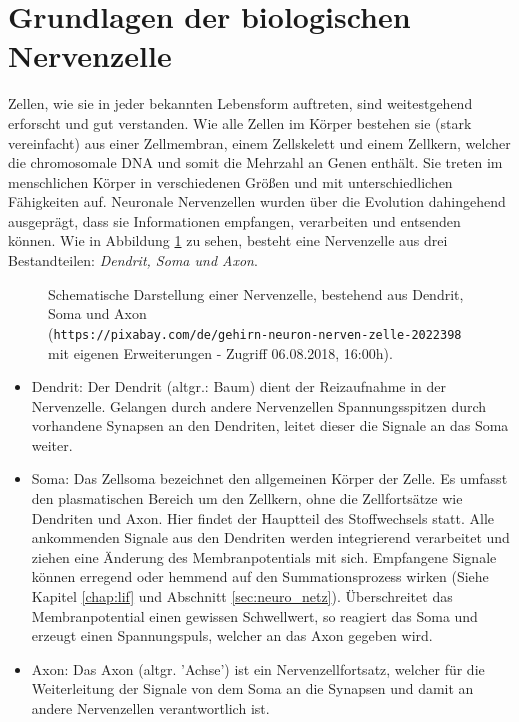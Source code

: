 \section{Grundlagen der biologischen Nervenzelle}
\label{sec:neuro_nervenzelle}
	Zellen, wie sie in jeder bekannten Lebensform auftreten, sind weitestgehend erforscht und gut verstanden. Wie alle Zellen im Körper bestehen sie (stark vereinfacht) aus einer Zellmembran, einem Zellskelett und einem Zellkern, welcher die chromosomale DNA und somit die Mehrzahl an Genen enthält. Sie treten im menschlichen Körper in verschiedenen Größen und mit unterschiedlichen Fähigkeiten auf. Neuronale Nervenzellen wurden über die Evolution dahingehend ausgeprägt, dass sie Informationen empfangen, verarbeiten und entsenden können. Wie in Abbildung \ref{fig:neuron} zu sehen, besteht eine Nervenzelle aus drei Bestandteilen: \textit{Dendrit, Soma und Axon}.
	\begin{figure}[H] %
		\centering
		\def\svgwidth{12cm}
		
		\caption{Schematische Darstellung einer Nervenzelle, bestehend aus Dendrit, Soma und Axon\\(\texttt{https://pixabay.com/de/gehirn-neuron-nerven-zelle-2022398} mit eigenen Erweiterungen - Zugriff 06.08.2018, 16:00h).}
		\label{fig:neuron}
	\end{figure}
	\begin{itemize}
		\item Dendrit:
			\subitem Der Dendrit (altgr.: \glqq Baum\grqq) dient der Reizaufnahme in der Nervenzelle. Gelangen durch andere Nervenzellen Spannungsspitzen durch vorhandene Synapsen an den Dendriten, leitet dieser die Signale an das Soma weiter.
		\item Soma:
			\subitem Das Zellsoma bezeichnet den allgemeinen Körper der Zelle. Es umfasst den plasmatischen Bereich um den Zellkern, ohne die Zellfortsätze wie Dendriten und Axon. Hier findet der Hauptteil des Stoffwechsels statt. Alle ankommenden Signale aus den Dendriten werden integrierend verarbeitet und ziehen eine Änderung des Membranpotentials mit sich. Empfangene Signale können erregend oder hemmend auf den Summationsprozess wirken (Siehe Kapitel \ref{chap:lif} und Abschnitt \ref{sec:neuro_netz}). Überschreitet das Membranpotential einen gewissen Schwellwert, so reagiert das Soma und erzeugt einen Spannungspuls, welcher an das Axon gegeben wird.
		\item Axon:
			\subitem Das Axon (altgr. 'Achse') ist ein Nervenzellfortsatz, welcher für die Weiterleitung der Signale von dem Soma an die Synapsen und damit an andere Nervenzellen verantwortlich ist.
	\end{itemize}
